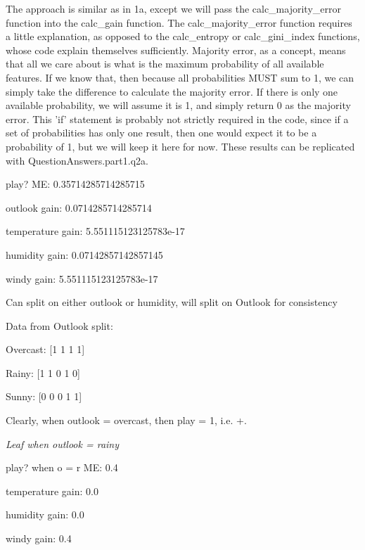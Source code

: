 \documentclass[12pt, fullpage,letterpaper]{article}
\begin{document}
\begin{enumerate}
\begin{enumerate}
	The approach is similar as in 1a, except we will pass the calc\_majority\_error function into the calc\_gain function. The calc\_majority\_error function requires a little explanation, as opposed to the calc\_entropy or calc\_gini\_index functions, whose code explain themselves sufficiently. Majority error, as a concept, means that all we care about is what is the maximum probability of all available features. If we know that, then because all probabilities MUST sum to 1, we can simply take the difference to calculate the majority error. If there is only one available probability, we will assume it is 1, and simply return 0 as the majority error. This 'if' statement is probably not strictly required in the code, since if a set of probabilities has only one result, then one would expect it to be a probability of 1, but we will keep it here for now. These results can be replicated with QuestionAnswers.part1.q2a.
	
    \vspace{5mm}

	play? ME:  0.35714285714285715
	
    outlook gain: 0.0714285714285714
    
    temperature gain: 5.551115123125783e-17
    
    humidity gain: 0.07142857142857145
    
    windy gain: 5.551115123125783e-17
    
    Can split on either outlook or humidity, will split on Outlook for consistency
    
    \vspace{5mm}
    
    Data from Outlook split:
    
    Overcast: [1 1 1 1]
    
    Rainy: [1 1 0 1 0]
    
    Sunny: [0 0 0 1 1]
    
    Clearly, when outlook = overcast, then play = 1, i.e. +.
    
    \vspace{5mm}
    \emph{Leaf when outlook = rainy}
    
    play? when o = r ME:  0.4
    
    temperature gain: 0.0
    
    humidity gain: 0.0
    
    windy gain: 0.4
    
    \vspace{5mm}
    

\end{enumerate}
\end{enumerate}
\end{document}
